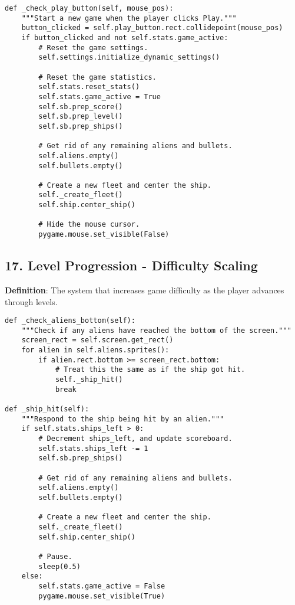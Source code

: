 \begin{lstlisting}
def _check_play_button(self, mouse_pos):
    """Start a new game when the player clicks Play."""
    button_clicked = self.play_button.rect.collidepoint(mouse_pos)
    if button_clicked and not self.stats.game_active:
        # Reset the game settings.
        self.settings.initialize_dynamic_settings()
        
        # Reset the game statistics.
        self.stats.reset_stats()
        self.stats.game_active = True
        self.sb.prep_score()
        self.sb.prep_level()
        self.sb.prep_ships()
        
        # Get rid of any remaining aliens and bullets.
        self.aliens.empty()
        self.bullets.empty()
        
        # Create a new fleet and center the ship.
        self._create_fleet()
        self.ship.center_ship()
        
        # Hide the mouse cursor.
        pygame.mouse.set_visible(False)
\end{lstlisting}

\subsection*{17. Level Progression - Difficulty Scaling}
\textbf{Definition}: The system that increases game difficulty as the player advances through levels.

\begin{lstlisting}
def _check_aliens_bottom(self):
    """Check if any aliens have reached the bottom of the screen."""
    screen_rect = self.screen.get_rect()
    for alien in self.aliens.sprites():
        if alien.rect.bottom >= screen_rect.bottom:
            # Treat this the same as if the ship got hit.
            self._ship_hit()
            break

def _ship_hit(self):
    """Respond to the ship being hit by an alien."""
    if self.stats.ships_left > 0:
        # Decrement ships_left, and update scoreboard.
        self.stats.ships_left -= 1
        self.sb.prep_ships()
        
        # Get rid of any remaining aliens and bullets.
        self.aliens.empty()
        self.bullets.empty()
        
        # Create a new fleet and center the ship.
        self._create_fleet()
        self.ship.center_ship()
        
        # Pause.
        sleep(0.5)
    else:
        self.stats.game_active = False
        pygame.mouse.set_visible(True)
\end{lstlisting}

